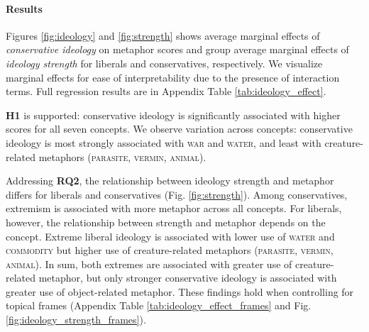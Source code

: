 

\paragraph{Results}

Figures \ref{fig:ideology} and \ref{fig:strength} shows average marginal effects of \textit{conservative ideology} on metaphor scores and group average marginal effects of \textit{ideology strength} for liberals and conservatives, respectively. We visualize marginal effects for ease of interpretability due to the presence of interaction terms. Full regression results are in Appendix Table \ref{tab:ideology_effect}.

\textbf{H1} is supported: conservative ideology is significantly associated with higher scores for all seven concepts. We observe variation across concepts: conservative ideology is most strongly associated with \textsc{war} and \textsc{water}, and least with creature-related metaphors (\textsc{parasite}, \textsc{vermin}, \textsc{animal}).




Addressing \textbf{RQ2}, the relationship between ideology strength and metaphor differs for liberals and conservatives (Fig. \ref{fig:strength}). Among conservatives, extremism is associated with more metaphor across all concepts. For liberals, however, the relationship between strength and metaphor depends on the concept. Extreme liberal ideology is associated with lower use of \textsc{water} and \textsc{commodity} but higher use of creature-related metaphors (\textsc{parasite}, \textsc{vermin}, \textsc{animal}). In sum, both extremes are associated with greater use of creature-related metaphor, but only stronger conservative ideology is associated with greater use of object-related metaphor. These findings hold when controlling for topical frames (Appendix Table \ref{tab:ideology_effect_frames} and Fig. \ref{fig:ideology_strength_frames}).

 









